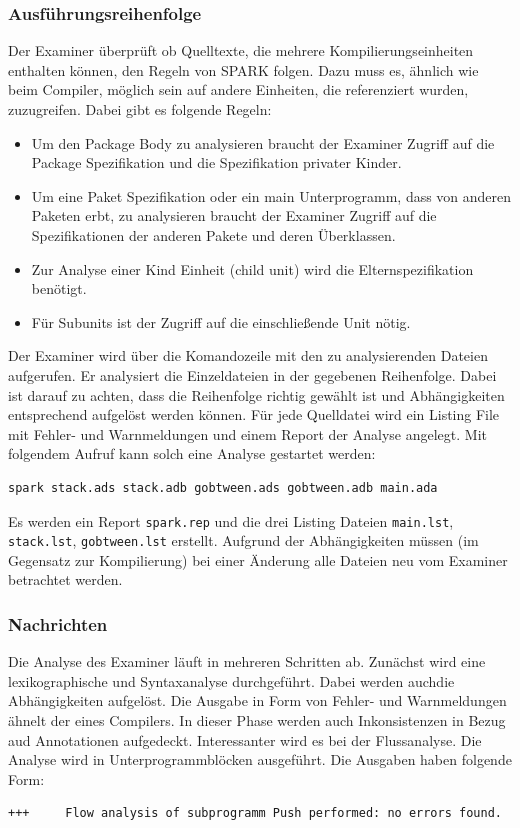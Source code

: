 \subsubsection{Ausführungsreihenfolge}
Der Examiner überprüft ob Quelltexte, die mehrere Kompilierungseinheiten enthalten können, den Regeln von SPARK folgen. Dazu muss es, ähnlich wie beim Compiler, möglich sein auf andere Einheiten, die referenziert wurden, zuzugreifen. Dabei gibt es folgende Regeln:

\begin{itemize}
\item Um den Package Body zu analysieren braucht der Examiner Zugriff auf die Package Spezifikation und die Spezifikation privater Kinder.
\item Um eine Paket Spezifikation oder ein main Unterprogramm, dass von anderen Paketen erbt, zu analysieren braucht der Examiner Zugriff auf die Spezifikationen der anderen Pakete und deren Überklassen.
\item Zur Analyse einer Kind Einheit (child unit) wird die Elternspezifikation benötigt.
\item Für Subunits ist der Zugriff auf die einschließende Unit nötig. 
\end{itemize}
Der Examiner wird über die Komandozeile mit den zu analysierenden Dateien aufgerufen. Er analysiert die Einzeldateien in der gegebenen Reihenfolge. Dabei ist darauf zu achten, dass die Reihenfolge richtig gewählt ist und Abhängigkeiten entsprechend aufgelöst werden können. Für jede Quelldatei wird ein Listing File mit Fehler- und Warnmeldungen und einem Report der Analyse angelegt.
Mit folgendem Aufruf kann solch eine Analyse gestartet werden:
\begin{verbatim}
spark stack.ads stack.adb gobtween.ads gobtween.adb main.ada
\end{verbatim}
Es werden ein Report \texttt{spark.rep} und die drei Listing Dateien \texttt{main.lst},  
\texttt{stack.lst}, \texttt{gobtween.lst} erstellt.
Aufgrund der Abhängigkeiten müssen (im Gegensatz zur Kompilierung) bei einer Änderung alle Dateien neu vom Examiner betrachtet werden.

\subsubsection{Nachrichten}
Die Analyse des Examiner läuft in mehreren Schritten ab. Zunächst wird eine lexikographische und Syntaxanalyse durchgeführt. Dabei werden auchdie Abhängigkeiten aufgelöst. Die Ausgabe in Form von Fehler- und Warnmeldungen ähnelt der eines Compilers. In dieser Phase werden auch Inkonsistenzen in Bezug aud Annotationen aufgedeckt.
Interessanter wird es bei der Flussanalyse. Die Analyse wird in Unterprogrammblöcken ausgeführt.
Die Ausgaben haben folgende Form:
\begin{verbatim}
+++		Flow analysis of subprogramm Push performed: no errors found.
\end{verbatim}

